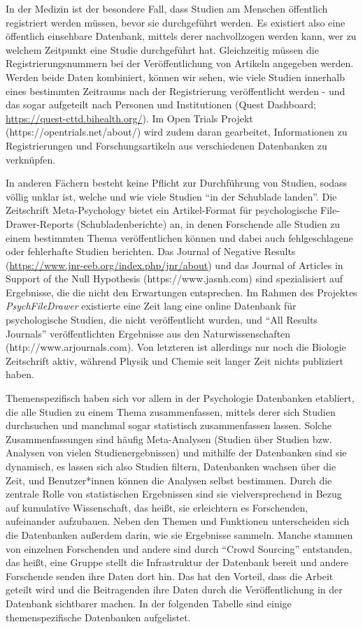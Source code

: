 \documentclass[
  letterpaper,
  DIV=11,
  numbers=noendperiod]{scrreprt}
\begin{document}
In der Medizin ist der besondere Fall, dass Studien am Menschen
öffentlich registriert werden müssen, bevor sie durchgeführt werden. Es
existiert also eine öffentlich einsehbare Datenbank, mittels derer
nachvollzogen werden kann, wer zu welchem Zeitpunkt eine Studie
durchgeführt hat. Gleichzeitig müssen die Registrierungsnummern bei der
Veröffentlichung von Artikeln angegeben werden. Werden beide Daten
kombiniert, können wir sehen, wie viele Studien innerhalb eines
bestimmten Zeitraums nach der Registrierung veröffentlicht werden - und
das sogar aufgeteilt nach Personen und Institutionen (Quest Dashboard;
\href{https://quest-cttd.bihealth.org/\#tabStart}{https://quest-cttd.bihealth.org/}).
Im Open Trials Projekt (https://opentrials.net/about/) wird zudem daran
gearbeitet, Informationen zu Registrierungen und Forschungsartikeln aus
verschiedenen Datenbanken zu verknüpfen.

In anderen Fächern besteht keine Pflicht zur Durchführung von Studien,
sodass völlig unklar ist, welche und wie viele Studien ``in der
Schublade landen''. Die Zeitschrift Meta-Psychology bietet ein
Artikel-Format für psychologische File-Drawer-Reports
(Schubladenberichte) an, in denen Forschende alle Studien zu einem
bestimmten Thema veröffentlichen können und dabei auch fehlgeschlagene
oder fehlerhafte Studien berichten. Das Journal of Negative Results
(\url{https://www.jnr-eeb.org/index.php/jnr/about}) und das Journal of
Articles in Support of the Null Hypothesis (https://www.jasnh.com) sind
spezialisiert auf Ergebnisse, die die nicht den Erwartungen entsprechen.
Im Rahmen des Projektes \emph{PsychFileDrawer} existierte eine Zeit lang
eine online Datenbank für psychologische Studien, die nicht
veröffentlicht wurden, und ``All Results Journals'' veröffentlichten
Ergebnisse aus den Naturwissenschaften (http://www.arjournals.com). Von
letzteren ist allerdings nur noch die Biologie Zeitschrift aktiv,
während Physik und Chemie seit langer Zeit nichts publiziert haben.

Themenspezifisch haben sich vor allem in der Psychologie Datenbanken
etabliert, die alle Studien zu einem Thema zusammenfassen, mittels derer
sich Studien durchsuchen und manchmal sogar statistisch zusammenfassen
lassen. Solche Zusammenfassungen sind häufig Meta-Analysen (Studien über
Studien bzw. Analysen von vielen Studienergebnissen) und mithilfe der
Datenbanken sind sie dynamisch, es lassen sich also Studien filtern,
Datenbanken wachsen über die Zeit, und Benutzer*innen können die
Analysen selbst bestimmen. Durch die zentrale Rolle von statistischen
Ergebnissen sind sie vielversprechend in Bezug auf kumulative
Wissenschaft, das heißt, sie erleichtern es Forschenden, aufeinander
aufzubauen. Neben den Themen und Funktionen unterscheiden sich die
Datenbanken außerdem darin, wie sie Ergebnisse sammeln. Manche stammen
von einzelnen Forschenden und andere sind durch ``Crowd Sourcing''
entstanden, das heißt, eine Gruppe stellt die Infrastruktur der
Datenbank bereit und andere Forschende senden ihre Daten dort hin. Das
hat den Vorteil, dass die Arbeit geteilt wird und die Beitragenden ihre
Daten durch die Veröffentlichung in der Datenbank sichtbarer machen. In
der folgenden Tabelle sind einige themenspezifische Datenbanken
aufgelistet.
\end{document}
